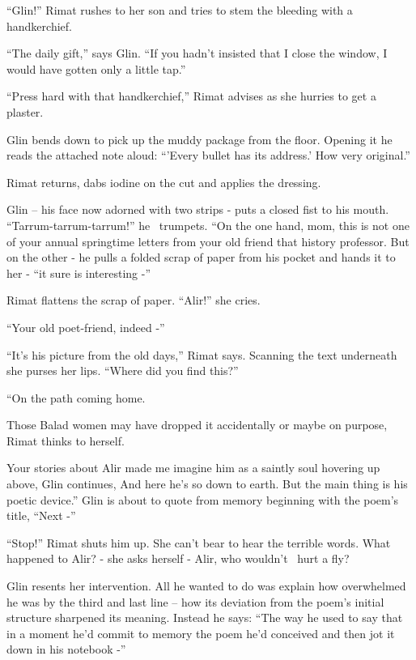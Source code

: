 \documentclass[letterpaper]{article}
\begin{document}
{{}``Glin!'' Rimat rushes to her son and tries to stem the bleeding
with a handkerchief. }

{{}``The daily gift,'' says Glin. ``If you hadn't insisted }that
{I close the window, I would have gotten only a }little
tap{.'' }

{{}``Press hard with }that
handkerchief,{{}'' Rimat advises as she hurries to get
a}{ }plaster.

{Glin bends down to pick up the muddy
}package{ from the floor. Opening it he reads the attached note aloud:
``'Every bullet has its address.' How }very{
}{original.''}

{Rimat returns, dabs iodine on the cut and }applies the
dressing{. }

{Glin }{}-- his face now adorned with two strips
-{ }{puts }a closed fist
{to his mouth. }{}``Tarrum-tarrum-tarrum!'' he \ trumpets. ``On the
one hand, mom,{ this is not one of your annual springtime letters from
your old friend that}{ }{history professor. But on the
other{\textquotedbl} - he pulls a folded scrap of paper from his pocket and hands it to }her
-{ ``it sure is interesting -'' }

{Rimat flattens the scrap of paper. ``Alir!'' she cries.}

{{}``Your old poet-friend, indeed -''}

{{}``It's his picture from the old days,'' Rimat says. Scanning the
text underneath she purses her lips. ``Where did you find this?'' }

{{}``On the path coming home.{\textquotedbl} }

Those Balad women may have dropped it accidentally or maybe on purpose, Rimat thinks to
herself{. }

{{\textquotedbl}Your stories about Alir made me imagine him as a
saintly soul hovering up above,{\textquotedbl} Glin continues, {\textquotedbl}And here he's so down to earth. But the
main thing is his poetic device.'' Glin is about to quote from memory beginning with the poem's title, ``Next -'' }

{{}``Stop!'' Rimat }shuts him
up{. She can't bear to hear the terrible words. What happened to Alir?
- she asks herself - Alir, who wouldn't~ hurt a fly?}

{Glin }resents her intervention. All he wanted to do
was{ explain how overwhelmed he was by the third and last line -- how
its deviation from the poem's initial structure sharpened its meaning. Instead he says: ``The way he used to say that
in a moment he'd commit to memory the poem }he'd conceived {and then
jot it down in his notebook -'' }
\end{document}
